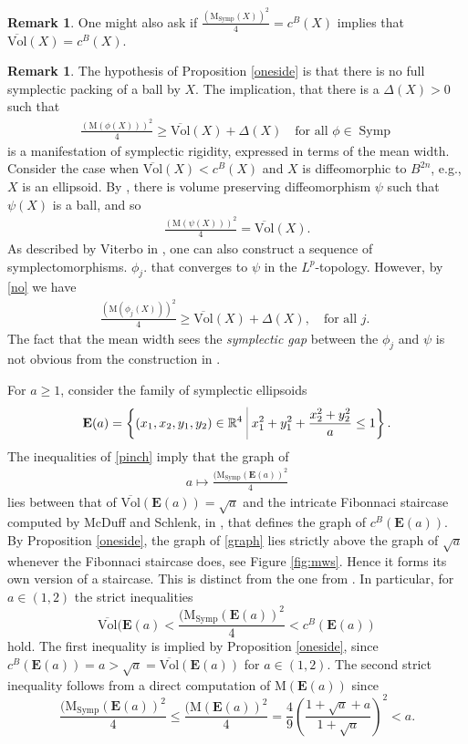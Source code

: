 \documentclass[12pt]{amsart}
\theoremstyle{definition}
\newtheorem{remark}[theorem]{Remark}
\newcommand\Symp{\operatorname{Symp}}
\def\bigmid{\ \rule[-3.5mm]{0.1mm}{9mm}\ }
\newcommand{\RR}{{\mathbb R}}
\newcommand{\mw}{{{\mathrm {M}}}}
\newcommand{\nlmw}{\mathrm{M}_{{\Symp}}}
\newcommand{\sv}{{\overline{{\mathrm{Vol}}}}}
\begin{document}
\begin{remark}
One might also ask if $\frac{(\nlmw(X))^2}{4}=c^B(X)$ implies that  $\sv(X)=c^B(X)$. 
\end{remark}
\medskip

 \begin{remark}The hypothesis of Proposition \ref{oneside} is that there is no full symplectic packing of a ball by $X$. The implication, that there is a $\Delta(X)>0$ such that \begin{align}\label{no}
  \frac{(\mw(\phi(X)))^2}{4} \geq \sv(X) +\Delta(X) \quad \text{for all $\phi \in \Symp$}
  \end{align}
is a manifestation of symplectic rigidity, expressed in terms of the mean width. Consider the case when $\sv(X)<c^B(X)$ and $X$ is diffeomorphic to $B^{2n}$, e.g., $X$ is an ellipsoid. By \cite{dm}, there is volume preserving diffeomorphism $\psi$ such that $\psi(X)$ is a ball, and so
\begin{align*}
  \frac{(\mw(\psi(X)))^2}{4}=\sv(X). 
\end{align*} 
As described by Viterbo in \cite{vit-lp}, one can also construct a sequence of symplectomorphisms. $\phi_{j}$. that converges to $\psi$ in the $L^p$-topology. 
However, by \eqref{no} we have
\begin{align*}
  \frac{(\mw(\phi_{j}(X)))^2}{4}\geq \sv(X) + \Delta(X), \quad \text{for all $j$. }
\end{align*} 
The fact that the mean width sees the {\em symplectic gap} between the $\phi_j$ and $\psi$ is not obvious from the construction in \cite{vit-lp}.
\end{remark}

 For $a \geq 1$, consider the family of symplectic ellipsoids $$\mathbf{E}(a)
= \left\{ (x_1,x_2,y_1,y_2) \in \RR^{4} \bigmid  x_1^2 + y_1^2 + \frac{x_2^2 + y_2^2}{a}  \leq 1\right\}.$$ 
The inequalities of \eqref{pinch} imply that the graph of 
\begin{align}\label{graph}
 a \mapsto \frac{(\nlmw(\mathbf{E}(a))^2}{4}   
\end{align} lies between that of $\sv(\mathbf{E}(a)) = \sqrt{a}$ and the intricate Fibonnaci staircase computed by McDuff and Schlenk, in \cite{mcs}, that defines the graph of $c^B(\mathbf{E}(a))$. By Proposition \ref{oneside}, the graph of \eqref{graph} lies strictly above the graph of $\sqrt{a}$ whenever the Fibonnaci staircase does, see Figure \ref{fig:mws}. Hence it forms its own version of a staircase. This is distinct from the one from \cite{mcs}. In particular, for $a \in (1,2)$ the strict inequalities 
$$
\sv(\mathbf{E}(a) < \frac{(\nlmw(\mathbf{E}(a))^2}{4} < c^B(\mathbf{E}(a))
$$
hold. The first inequality is implied by Proposition \ref{oneside}, since $c^B(\mathbf{E}(a)) = a > \sqrt{a} = \sv(\mathbf{E}(a))$ for $a \in (1,2)$. The second strict inequality follows from a direct computation of $\mw(\mathbf{E}(a))$ since  $$\frac{(\nlmw(\mathbf{E}(a))^2}{4}\leq \frac{(\mw(\mathbf{E}(a))^2}{4}=\frac{4}{9} \left( \frac{1 +\sqrt{a}+a}{1+\sqrt{a}}\right)^2 <a.$$
\end{document}
